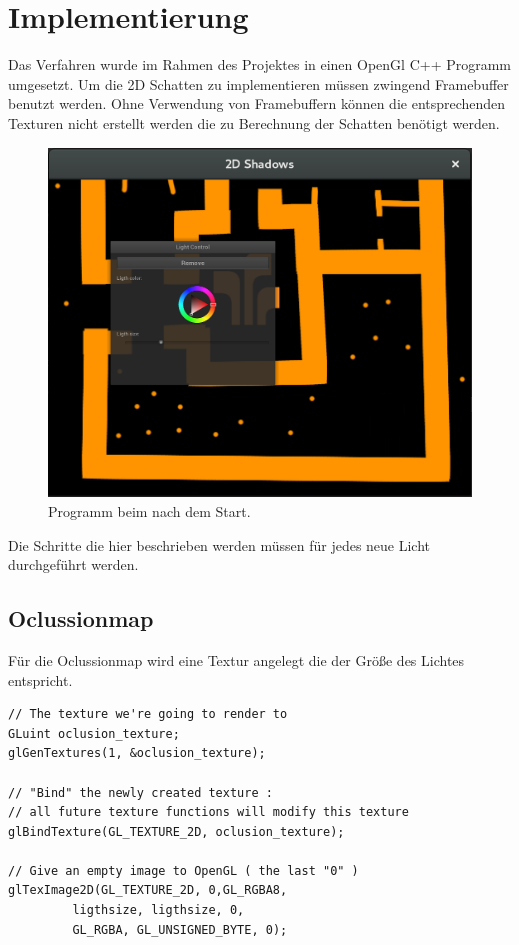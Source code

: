 \chapter{Implementierung}
Das Verfahren wurde im Rahmen des Projektes in einen OpenGl C++ Programm umgesetzt.
Um die 2D Schatten zu implementieren müssen zwingend Framebuffer benutzt werden.
Ohne Verwendung von Framebuffern können die entsprechenden Texturen nicht erstellt werden die zu Berechnung der Schatten benötigt werden. 
\begin{figure}
	\centering
	\includegraphics[scale=0.25]{images/Bildschirmfoto_1.png}
	\caption{Programm beim nach dem Start.}
	\label{p_1}
\end{figure}

Die Schritte die hier beschrieben werden müssen für jedes neue Licht durchgeführt werden.

\section{Oclussionmap}

Für die Oclussionmap wird eine Textur angelegt die der Größe des Lichtes entspricht.
\begin{lstlisting}
// The texture we're going to render to
GLuint oclusion_texture;
glGenTextures(1, &oclusion_texture);

// "Bind" the newly created texture : 
// all future texture functions will modify this texture
glBindTexture(GL_TEXTURE_2D, oclusion_texture);

// Give an empty image to OpenGL ( the last "0" )
glTexImage2D(GL_TEXTURE_2D, 0,GL_RGBA8,
		 ligthsize, ligthsize, 0,
		 GL_RGBA, GL_UNSIGNED_BYTE, 0);
\end{lstlisting}

